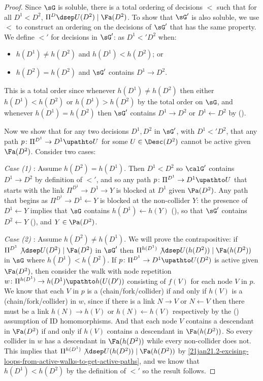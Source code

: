 \begin{proof}
Since $\sG$ is soluble, there is a total ordering of decisions $<$  such that for all $D^1<D^2$, $\Pi^{D} \dsep U(D^2) \mid \Fa(D^2)$. 
To show that $\sG'$ is also soluble, we use $<$ to construct an ordering on the decisions of $\sG'$ that has the same property. 
We define $<'$ for decisions in $\sG'$: as $D^1 <' D^2$ when:~
\begin{itemize}
    \item $h(D^1) \neq h(D^2)$ and $h(D^1) < h({D^2})$; or
    \item $h(D^2) = h(D^2)$ and $\sG'$ contains $D^1 \to D^2$.
\end{itemize}
This is a total order since whenever $h(D^1) \neq h(D^2)$ then either $h(D^1) < h(D^2)$ or $h(D^1) > h(D^2)$ by the total order on $\sG$, and whenever $h(D^1) = h(D^2)$ then $\sG'$ contains $D^1 \to D^2$ or $D^1 \leftarrow D^2$ by (\combinesonlylinkeddecisions).

\newcommand{\porig}{p_\sorig}
\newcommand{\porigwalk}{w}
Now we show that for any two decisions $D^1,D^2$ in $\sG'$, with $D^1<'D^2$, that any path $p\colon \Pi^{D^1} \to D^1 \upathto U$ for some $U \in \Desc (D^2)$ cannot be active given $\Fa(D^2)$. Consider two cases:

	\textit{Case (1) }: Assume $h(D^2)\!=\!h(D^1)$. Then $D^1\!<\!D^2$ so $\calG'$ contains $D^1 \to D^2$ by definition of $<'$, 
	and so any path $p\colon \Pi^{D^1} \to D^1 \upathto U$ that starts with the link $\Pi^{D^1} \to D^1 \to Y$ is blocked at $D^1$ given $\Pa({D^2})$.
	Any path that begins as $\Pi^{D^1} \to D^1 \leftarrow Y$ is blocked at the non-collider $Y$:
	the presence of $D^1 \leftarrow Y$ implies 
	that $\sG$ contains $h(D^1) \leftarrow h(Y)$ (\preserveslinks),
	so that $\sG'$ contains $D^2 \leftarrow Y$ (\coversallinfolinks), 
	and $Y \in \Pa(D^2)$.
	
	
	\textit{Case (2)} : Assume $h(D^2)\neq h(D^1)$. 
	We will prove the contrapositive:
	if $\Pi^{D^1} \not\dsep U(D^2) \mid \Fa(D^2)$ in $\sG'$
	then $\Pi^{h(D^1)} \not\dsep U(h(D^2)) \mid \Fa(h(D^2))$ in $\sG$ where $h(D^1)<h(D^2)$.
	If $p\colon\Pi^{D^1} \to D^1 \upathto U(D^2)$ is active given $\Fa(D^2)$, then consider the walk with node repetition $\porigwalk\colon\Pi^{h(D^1)} \to h(D^1) \upathto h(U(D'))$ consisting of 
	$f(V)$ for each node $V$ in $p$. 
	We know that each $V$ in $p$ is a (chain/fork/collider) if and only if 
	$h(V)$ is a (chain/fork/collider) in $\porigwalk$, since if there is a link $N\to V$ or $N\gets V$ then there must be a link $h(N)\to h(V)$ or $h(N) \gets h(V)$ respectively by the (\preserveslinks) assumption of ID homomorphisms. 
	And that each node $V$ contains a descendant in $\Fa(D^2)$
	if and only if $h(V)$ contains a descendant in $\Fa(h(D^2))$.
	So every collider in $w$ has a descendant in $\Fa(h(D^2))$ while every non-collider does not.
	This implies that $\Pi^{h(D^1)} \not \dsep U(h(D^2)) \mid \Fa(h(D^2))$ by \cref{21jan21.2-excising-loops-from-active-walks-to-get-active-paths}, 
	and we know that $h(D^1)<h(D^2)$ by the definition of $<'$
	so the result follows.
\end{proof}



